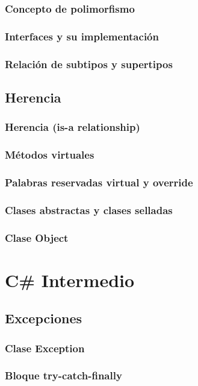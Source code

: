 \documentclass[12pt,a4paper]{report}
\begin{document}
{\section{Concepto de polimorfismo}
\section{Interfaces y su implementación}
\section{Relación de subtipos y supertipos}

\chapter{Herencia}
\section{Herencia (is-a relationship)}
\section{Métodos virtuales}
\section{Palabras reservadas virtual y override}
\section{Clases abstractas y clases selladas}
\section{Clase Object}

\part{C\# Intermedio}

\chapter{Excepciones}
\section{Clase Exception}
\section{Bloque try-catch-finally}
}
\end{document}
